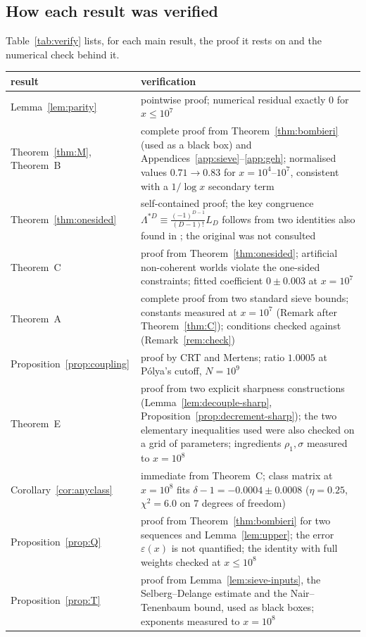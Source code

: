 \subsection{How each result was verified}
Table~\ref{tab:verify} lists, for each main result, the proof it rests on and the numerical check behind it.
\begin{table}[H]
\centering
\small
\begin{tabular}{p{3.4cm}p{9.2cm}}
\toprule
result & verification\\
\midrule
Lemma~\ref{lem:parity} & pointwise proof; numerical residual exactly $0$ for $x\le10^7$\\
Theorem~\ref{thm:M}, Theorem~B & complete proof from Theorem~\ref{thm:bombieri} (used as a black box) and Appendices~\ref{app:sieve}--\ref{app:geh}; normalised values $0.71\to0.83$ for $x=10^4$--$10^7$, consistent with a $1/\log x$ secondary term\\
Theorem~\ref{thm:onesided} & self-contained proof; the key congruence $\Lambda^{*D}\equiv\frac{(-1)^{D-1}}{(D-1)!}L_D$ follows from two identities also found in \cite[Lemma~1]{FI78}; the original \cite{Bom76} was not consulted\\
Theorem~C & proof from Theorem~\ref{thm:onesided}; artificial non-coherent worlds violate the one-sided constraints; fitted coefficient $0\pm0.003$ at $x=10^7$\\
Theorem~A & complete proof from two standard sieve bounds; constants measured at $x=10^7$ (Remark after Theorem~\ref{thm:C}); conditions checked against \cite{HR21,Pil23} (Remark~\ref{rem:check})\\
Proposition~\ref{prop:coupling} & proof by CRT and Mertens; ratio $1.0005$ at Pólya's cutoff, $N=10^9$\\
Theorem~E & proof from two explicit sharpness constructions (Lemma~\ref{lem:decouple-sharp}, Proposition~\ref{prop:decrement-sharp}); the two elementary inequalities used were also checked on a grid of parameters; ingredients $\rho_1,\sigma$ measured to $x=10^8$\\
Corollary~\ref{cor:anyclass} & immediate from Theorem~C; class matrix at $x=10^8$ fits $\delta-1=-0.0004\pm0.0008$ ($\eta=0.25$, $\chi^2=6.0$ on $7$ degrees of freedom)\\
Proposition~\ref{prop:Q} & proof from Theorem~\ref{thm:bombieri} for two sequences and Lemma~\ref{lem:upper}; the error $\varepsilon(x)$ is not quantified; the identity with full weights checked at $x\le10^8$\\
Proposition~\ref{prop:T} & proof from Lemma~\ref{lem:sieve-inputs}, the Selberg--Delange estimate and the Nair--Tenenbaum bound, used as black boxes; exponents measured to $x=10^8$\\

\end{tabular}
\end{table}
